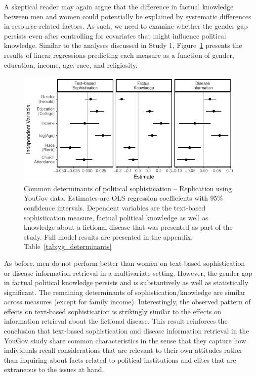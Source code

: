 \documentclass[12pt]{article}
\begin{document}
A skeptical reader may again argue that the difference in factual knowledge between men and women could potentially be explained by systematic differences in resource-related factors. As such, we need to examine whether the gender gap persists even after controlling for covariates that might influence political knowledge. Similar to the analyses discussed in Study 1, Figure~\ref{fig:yg_determinants} presents the results of linear regressions predicting each measure as a function of gender, education, income, age, race, and religiosity.

\begin{figure}[h]\centering
\includegraphics{../fig/yg_determinants.pdf}
\caption{Common determinants of political sophistication -- Replication using YouGov data. Estimates are OLS regression coefficients with 95\% confidence intervals. Dependent variables are the text-based sophistication measure, factual political knowledge as well as knowledge about a fictional disease that was presented as part of the study. Full model results are presented in the appendix, Table~\ref{tab:yg_determinants}}\label{fig:yg_determinants}
\end{figure}

As before, men do not perform better than women on text-based sophistication or disease information retrieval in a multivariate setting. However, the gender gap in factual political knowledge persists and is substantively as well as statistically significant. The remaining determinants of sophistication/knowledge are similar across measures (except for family income). Interestingly, the observed pattern of effects on text-based sophistication is strikingly similar to the effects on information retrieval about the fictional disease. This result reinforces the conclusion that text-based sophistication and disease information retrieval in the YouGov study share common characteristics in the sense that they capture how individuals recall considerations that are relevant to their own attitudes rather than inquiring about facts related to political institutions and elites that are extraneous to the issues at hand.
\end{document}
